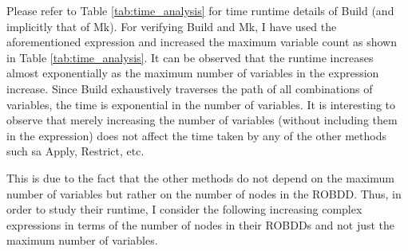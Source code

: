 \documentclass[a4paper, titlepage, 12pt]{article}
\numberwithin{equation}{section}
\begin{document}
            Please refer to Table \ref{tab:time_analysis} for time runtime details of Build (and implicitly that of Mk).
            For verifying Build and Mk, I have used the aforementioned expression and increased the maximum variable count as shown in Table \ref{tab:time_analysis}.
            It can be observed that the runtime increases almost exponentially as the maximum number of variables in the expression increase.
            Since Build exhaustively traverses the path of all combinations of variables, the time is exponential in the number of variables.
            It is interesting to observe that merely increasing the number of variables (without including them in the expression) does not affect the time taken by any of the other methods such sa Apply, Restrict, etc.

            This is due to the fact that the other methods do not depend on the maximum number of variables but rather on the number of nodes in the ROBDD.
            Thus, in order to study their runtime, I consider the following increasing complex expressions in terms of the number of nodes in their ROBDDs and not just the maximum number of variables.
            
\end{document}
